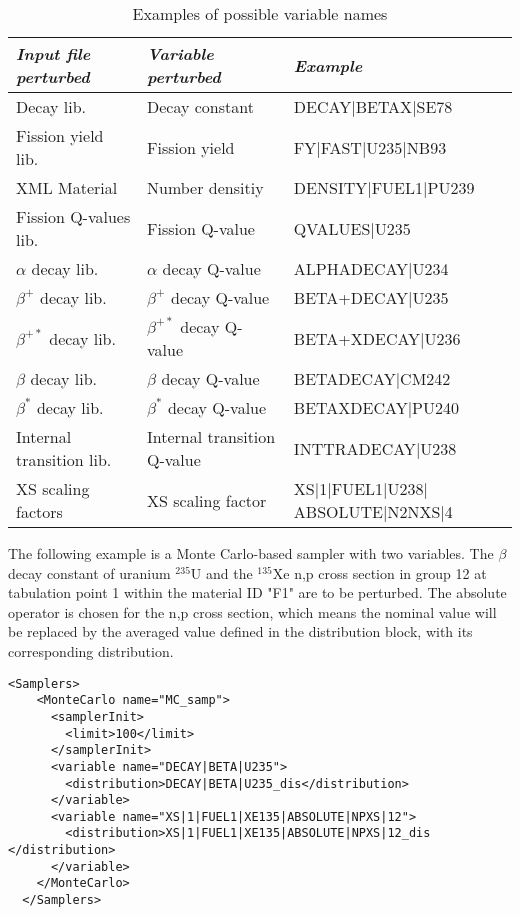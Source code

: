 \begin{table}[]
\centering
\caption{Examples of possible variable names}\label{VariableExampleTable}
\begin{tabular}{l|l|l}
\textit{Input file perturbed} & \textit{Variable perturbed}  & \textit{Example}  \\
\hline
Decay lib.               & Decay constant              & DECAY$\vert$BETAX$\vert$SE78     \\
Fission yield lib.       & Fission yield               & FY$\vert$FAST$\vert$U235$\vert$NB93       \\
XML Material             & Number densitiy             & DENSITY$\vert$FUEL1$\vert$PU239     \\
Fission Q-values lib.    & Fission Q-value              & QVALUES$\vert$U235            \\
$\alpha$ decay lib.      & $\alpha$ decay Q-value       & ALPHADECAY$\vert$U234         \\
$\beta^{+}$ decay lib.     & $\beta^{+}$ decay Q-value      & BETA+DECAY$\vert$U235         \\
$\beta^{+*}$ decay lib.  & $\beta^{+*}$ decay Q-value   & BETA+XDECAY$\vert$U236        \\
$\beta$ decay lib.       & $\beta$ decay Q-value       & BETADECAY$\vert$CM242         \\
$\beta^{*}$ decay lib.     & $\beta^{*}$ decay Q-value      & BETAXDECAY$\vert$PU240        \\
Internal transition lib. & Internal transition Q-value  & INTTRADECAY$\vert$U238        \\
XS scaling factors       & XS scaling factor           & XS$\vert$1$\vert$FUEL1$\vert$U238$\vert$ABSOLUTE$\vert$N2NXS$\vert$4 \\
\end{tabular}
\end{table}

The following example is a Monte Carlo-based sampler with two variables. The $\beta$ decay constant of
 uranium $^{235}$U and the $^{135}$Xe n,p cross section in group 12 at tabulation point 1 within the material
  ID "F1" are to be perturbed. The absolute operator is chosen for the n,p cross section, which means the
  nominal value will be replaced by the averaged value defined in the distribution block, with its corresponding distribution.

\begin{lstlisting}[style=XML]
  <Samplers>
    <MonteCarlo name="MC_samp">
      <samplerInit>
        <limit>100</limit>
      </samplerInit>
      <variable name="DECAY|BETA|U235">
        <distribution>DECAY|BETA|U235_dis</distribution>
      </variable>
      <variable name="XS|1|FUEL1|XE135|ABSOLUTE|NPXS|12">
        <distribution>XS|1|FUEL1|XE135|ABSOLUTE|NPXS|12_dis                   </distribution>
      </variable>
    </MonteCarlo>
  </Samplers>
\end{lstlisting}

